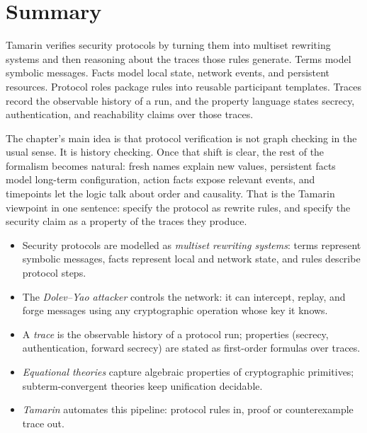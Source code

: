 \section{Summary}
\label{sec:tamarin-summary}

Tamarin verifies security protocols by turning them into multiset rewriting
systems and then reasoning about the traces those rules generate.  Terms model
symbolic messages.  Facts model local state, network events, and persistent
resources.  Protocol roles package rules into reusable participant templates.
Traces record the observable history of a run, and the property language
states secrecy, authentication, and reachability claims over those traces.

The chapter's main idea is that protocol verification is not graph checking in
the usual sense.  It is history checking.  Once that shift is clear, the rest
of the formalism becomes natural: fresh names explain new values, persistent
facts model long-term configuration, action facts expose relevant events, and
timepoints let the logic talk about order and causality.  That is the
Tamarin viewpoint in one sentence: specify the protocol as rewrite rules, and
specify the security claim as a property of the traces they produce.

\begin{summarybox}
\begin{itemize}[nosep]
  \item Security protocols are modelled as \emph{multiset rewriting systems}:
    terms represent symbolic messages, facts represent local and network
    state, and rules describe protocol steps.
  \item The \emph{Dolev--Yao attacker} controls the network: it can
    intercept, replay, and forge messages using any cryptographic
    operation whose key it knows.
  \item A \emph{trace} is the observable history of a protocol run;
    properties (secrecy, authentication, forward secrecy) are stated
    as first-order formulas over traces.
  \item \emph{Equational theories} capture algebraic properties of
    cryptographic primitives; subterm-convergent theories keep
    unification decidable.
  \item \emph{Tamarin} automates this pipeline: protocol rules in,
    proof or counterexample trace out.
\end{itemize}
\end{summarybox}

